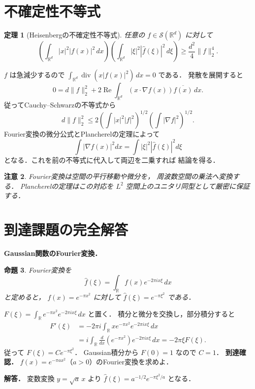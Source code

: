 \documentclass[a5paper,10pt,onecolumn]{jsarticle}
\makeatletter
\theoremstyle{mathnotetheorem}
\newtheorem{theorem}{定理}[section]
\newtheorem{proposition}[theorem]{命題}
\newtheorem{remark}[theorem]{注意}
\renewcommand{\proofname}{証明}
\renewenvironment{proof}[1][\proofname]{%
  \par\pushQED{\qed}\normalfont\topsep4\p@\@plus2\p@\relax
  \trivlist\item[\hskip\labelsep\bfseries #1]\ignorespaces
}{\popQED\endtrivlist\@endpefalse}
\newcommand{\norm}[1]{\lVert #1\rVert}
\makeatother
\begin{document}
\section{不確定性不等式}

\begin{theorem}[Heisenbergの不確定性不等式]\label{thm:heisenberg}
任意の $f\in\mathcal S(\mathbb R^d)$ に対して
\[
 \left(\int_{\mathbb R^d}|x|^2|f(x)|^2\,dx\right)
 \left(\int_{\mathbb R^d}|\xi|^2|\widehat f(\xi)|^2\,d\xi\right)
 \ge\frac{d^2}{4}\norm f_2^4.
\]
\end{theorem}
\begin{proof}
$f$ は急減少するので
$\int_{\mathbb R^d}\operatorname{div}(x|f(x)|^2)\,dx=0$
である．
発散を展開すると
\[
 0=d\norm f_2^2
 +2\operatorname{Re}\int_{\mathbb R^d}
 (x\cdot\nabla f(x))\overline{f(x)}\,dx.
\]
従ってCauchy--Schwarzの不等式から
\[
 d\norm f_2^2
 \le2\left(\int|x|^2|f|^2\right)^{1/2}
       \left(\int|\nabla f|^2\right)^{1/2}.
\]
Fourier変換の微分公式とPlancherelの定理によって
\[
 \int|\nabla f(x)|^2dx
 =\int|\xi|^2|\widehat f(\xi)|^2d\xi
\]
となる．これを前の不等式に代入して両辺を二乗すれば
結論を得る．
\end{proof}

\begin{remark}
Fourier変換は空間の平行移動や微分を，
周波数空間の乗法へ変換する．
Plancherelの定理はこの対応を
$L^2$ 空間上のユニタリ同型として厳密に保証する．
\end{remark}

\section{到達課題の完全解答}
\noindent\textbf{Gaussian関数のFourier変換．}
\begin{proposition}
Fourier変換を
\[
\widehat f(\xi)=\int_{\mathbb R}f(x)e^{-2\pi ix\xi}\,dx
\]
と定めると，
$f(x)=e^{-\pi x^2}$ に対して
$\widehat f(\xi)=e^{-\pi\xi^2}$ である．
\end{proposition}
\begin{proof}
$F(\xi)=\int_{\mathbb R}
e^{-\pi x^2}e^{-2\pi ix\xi}\,dx$ と置く．
積分と微分を交換し，部分積分すると
\[
\begin{aligned}
F'(\xi)
&=-2\pi i\int_{\mathbb R}
xe^{-\pi x^2}e^{-2\pi ix\xi}\,dx\\
&=i\int_{\mathbb R}
\frac d{dx}(e^{-\pi x^2})
e^{-2\pi ix\xi}\,dx
=-2\pi\xi F(\xi).
\end{aligned}
\]
従って $F(\xi)=Ce^{-\pi\xi^2}$．
Gaussian積分から $F(0)=1$ なので $C=1$．
\end{proof}
\noindent\textbf{到達確認．}
$f(x)=e^{-\pi ax^2}$（$a>0$）のFourier変換を求めよ．
\par\noindent\textbf{解答．}
変数変換 $y=\sqrt a\,x$ より
$\widehat f(\xi)=a^{-1/2}e^{-\pi\xi^2/a}$ となる．
\end{document}
